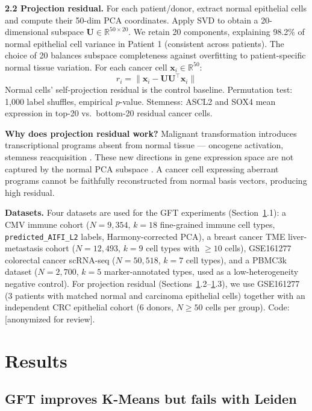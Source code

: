 \documentclass{article}
\begin{document}
\textbf{2.2 Projection residual.} For each patient/donor, extract normal epithelial cells and compute their 50-dim PCA coordinates. Apply SVD to obtain a 20-dimensional subspace $\mathbf{U} \in \mathbb{R}^{50 \times 20}$. We retain 20 components, explaining 98.2\% of normal epithelial cell variance in Patient 1 (consistent across patients). The choice of 20 balances subspace completeness against overfitting to patient-specific normal tissue variation. For each cancer cell $\mathbf{x}_i \in \mathbb{R}^{50}$:
\[
r_i = \|\mathbf{x}_i - \mathbf{U}\mathbf{U}^\top \mathbf{x}_i\|
\]
Normal cells' self-projection residual is the control baseline. Permutation test: 1,000 label shuffles, empirical $p$-value. Stemness: ASCL2 and SOX4 mean expression in top-20 vs.\ bottom-20 residual cancer cells.

\textbf{Why does projection residual work?} Malignant transformation introduces transcriptional programs absent from normal tissue --- oncogene activation, stemness reacquisition \citep{hanahan2011}. These new directions in gene expression space are not captured by the normal PCA subspace \citep{tirosh2016}. A cancer cell expressing aberrant programs cannot be faithfully reconstructed from normal basis vectors, producing high residual.

\textbf{Datasets.} Four datasets are used for the GFT experiments (Section~\ref{sec:results}.1): a CMV immune cohort \citep{cmv} ($N=9{,}354$, $k=18$ fine-grained immune cell types, \texttt{predicted\_AIFI\_L2} labels, Harmony-corrected PCA), a breast cancer TME liver-metastasis cohort \citep{tme} ($N=12{,}493$, $k=9$ cell types with $\geq10$ cells), GSE161277 colorectal cancer scRNA-seq \citep{gse161277} ($N=50{,}518$, $k=7$ cell types), and a PBMC3k dataset \citep{pbmc3k} ($N=2{,}700$, $k=5$ marker-annotated types, used as a low-heterogeneity negative control). For projection residual (Sections~\ref{sec:results}.2--\ref{sec:results}.3), we use GSE161277 (3 patients with matched normal and carcinoma epithelial cells) together with an independent CRC epithelial cohort \citep{crc_epith} (6 donors, $N\geq50$ cells per group). Code: [anonymized for review].

\section{Results}
\label{sec:results}

\subsection{GFT improves K-Means but fails with Leiden}
\end{document}
